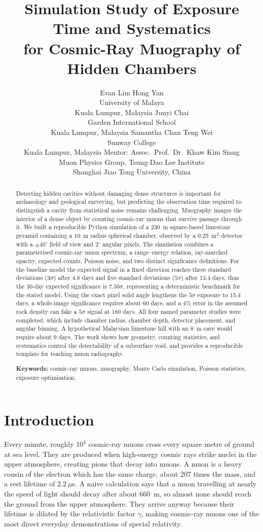 \documentclass{article}
\title{Simulation Study of Exposure Time and Systematics\\
       for Cosmic-Ray Muography of Hidden Chambers}
\author{%
  Evan Lim Hong Yan \\
  University of Malaya \\
  Kuala Lumpur, Malaysia
  \And
  Junyi Chai \\
  Garden International School \\
  Kuala Lumpur, Malaysia
  \And
  Samantha Chan Teng Wei \\
  Sunway College \\
  Kuala Lumpur, Malaysia
  \AND
  Mentor: Assoc.\ Prof.\ Dr.\ Khaw Kim Siang \\
  Muon Physics Group, Tsung-Dao Lee Institute \\
  Shanghai Jiao Tong University, China
}
\begin{document}
\maketitle

\begin{abstract}
Detecting hidden cavities without damaging dense structures is important for
archaeology and geological surveying, but predicting the observation time
required to distinguish a cavity from statistical noise remains challenging.
Muography images the interior of a dense object by counting cosmic-ray muons
that survive passage through it. We built a reproducible Python simulation of a
230~m square-based limestone pyramid containing a 10~m radius spherical
chamber, observed by a 0.25~m$^2$ detector with a $\pm40^\circ$ field of view
and $2^\circ$ angular pixels. The simulation combines a parameterised cosmic-ray
muon spectrum, a range--energy relation, ray-marched opacity, expected
counts, Poisson noise, and two distinct significance definitions. For the
baseline model the expected signal in a fixed direction reaches three standard
deviations ($3\sigma$) after 4.8 days and five standard deviations
($5\sigma$) after 13.4 days, thus the 30-day expected significance is
$7.50\sigma$, representing a deterministic benchmark for the stated model. Using the exact pixel solid angle lengthens the $5\sigma$
exposure to 15.4 days, a whole-image significance requires about 60 days, and a
4\% error in the assumed rock density can fake a $5\sigma$ signal at 180 days.
All four named parameter studies were completed, which include chamber radius, chamber
depth, detector placement, and angular binning. A hypothetical Malaysian
limestone hill with an 8~m cave would require about 9 days. The work shows how
geometry, counting statistics, and systematics control the detectability of a
subsurface void, and provides a reproducible template for teaching muon
radiography.

\textbf{Keywords:} cosmic-ray muons, muography, Monte Carlo simulation,
Poisson statistics, exposure optimisation.
\end{abstract}

\section{Introduction}

Every minute, roughly $10^4$ cosmic-ray muons cross every square metre of
ground at sea level. They are produced when high-energy cosmic rays strike
nuclei in the upper atmosphere, creating pions that decay into muons. A muon is
a heavy cousin of the electron which has the same charge, about 207 times the mass, and
a rest lifetime of $2.2~\mu$s. A naive calculation says that a muon travelling
at nearly the speed of light should decay after about 660~m, so almost none
should reach the ground from the upper atmosphere. They arrive anyway because
their lifetime is dilated by the relativistic factor $\gamma$, making cosmic-ray muons
one of the most direct everyday demonstrations of special relativity.
\end{document}
